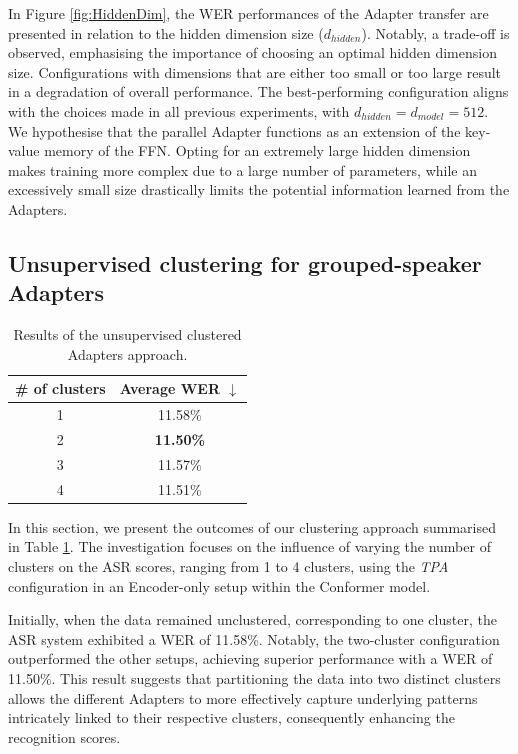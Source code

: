 In Figure \ref{fig:HiddenDim}, the \ac{WER} performances of the Adapter transfer are presented in relation to the hidden dimension size ($d_{hidden}$). Notably, a trade-off is observed, emphasising the importance of choosing an optimal hidden dimension size. Configurations with dimensions that are either too small or too large result in a degradation of overall performance. The best-performing configuration aligns with the choices made in all previous experiments, with $d_{hidden} = d_{model} = 512$. We hypothesise that the parallel Adapter functions as an extension of the key-value memory of the \ac{FFN}. Opting for an extremely large hidden dimension makes training more complex due to a large number of parameters, while an excessively small size drastically limits the potential information learned from the Adapters. 

\subsection{Unsupervised clustering for grouped-speaker Adapters}

\begin{table}[t]
    \begin{center}    
    \begin{tabular}{cc}
    \hline
      \# of clusters & Average WER $\downarrow$    \\ \hline
    \multicolumn{1}{c}{1} & 11.58\%  \\%
    \multicolumn{1}{c}{2} & \textbf{11.50\%}  \\
    \multicolumn{1}{c}{3} & 11.57\%  \\
    \multicolumn{1}{c}{4} & 11.51\%  \\ \hline 
    \end{tabular}
    \end{center}
    \caption{Results of the unsupervised clustered Adapters approach.}
    \label{tab:res_clusters}
    \end{table}


In this section, we present the outcomes of our clustering approach summarised in Table \ref{tab:res_clusters}. The investigation focuses on the influence of varying the number of clusters on the \ac{ASR} scores, ranging from 1 to 4 clusters, using the \textit{\ac{TPA}} configuration in an Encoder-only setup within the Conformer model.

Initially, when the data remained unclustered, corresponding to one cluster, the \ac{ASR} system exhibited a \ac{WER} of 11.58\%. Notably, the two-cluster configuration outperformed the other setups, achieving superior performance with a \ac{WER} of 11.50\%. This result suggests that partitioning the data into two distinct clusters allows the different Adapters to more effectively capture underlying patterns intricately linked to their respective clusters, consequently enhancing the recognition scores.

